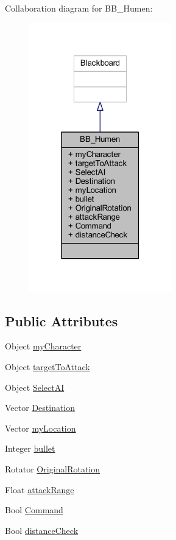 Collaboration diagram for B\+B\+\_\+\+Humen\+:\nopagebreak
\begin{figure}[H]
\begin{center}
\leavevmode
\includegraphics[width=175pt]{class_b_b___humen__coll__graph}
\end{center}
\end{figure}
\subsection*{Public Attributes}
\begin{DoxyCompactItemize}
\item 
Object \hyperlink{class_b_b___humen_a7f9491363e6d98dd20be54751e78c76b}{my\+Character}
\item 
Object \hyperlink{class_b_b___humen_a4d3316519116e095dd0b34472b5f24d4}{target\+To\+Attack}
\item 
Object \hyperlink{class_b_b___humen_a6a1bca9746fc00983e69bc821ccdeda7}{Select\+AI}
\item 
Vector \hyperlink{class_b_b___humen_a52f772a3da5b3c23c6ff239571573a10}{Destination}
\item 
Vector \hyperlink{class_b_b___humen_a135f2ee9b81ee3285d27e52ecf2c147c}{my\+Location}
\item 
Integer \hyperlink{class_b_b___humen_a87f003bcd85b60d96e6ef1ebab51976e}{bullet}
\item 
Rotator \hyperlink{class_b_b___humen_af8860690e8fc6772d27a923223e424ec}{Original\+Rotation}
\item 
Float \hyperlink{class_b_b___humen_a9fb506718878e67dd7ce4889188fd9c3}{attack\+Range}
\item 
Bool \hyperlink{class_b_b___humen_a5f3cc37acdcbf06281e92a1792354864}{Command}
\item 
Bool \hyperlink{class_b_b___humen_a4f067f9c00145461036a0419a631dd06}{distance\+Check}
\end{DoxyCompactItemize}


